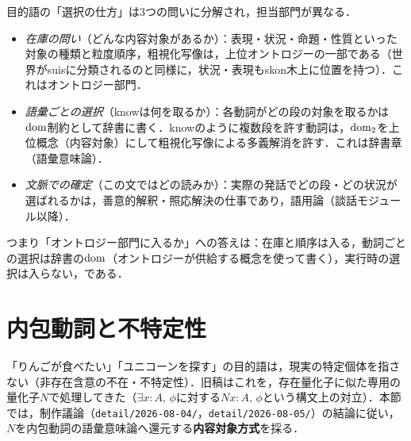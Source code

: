 \documentclass[../../main-detail.tex]{subfiles}
\begin{document}
\begin{remark}[部門の分担]
    目的語の「選択の仕方」は3つの問いに分解され，担当部門が異なる．
    \begin{itemize}
        \item \emph{在庫の問い}（どんな内容対象があるか）：表現・状況・命題・性質といった対象の種類と粒度順序，粗視化写像は，上位オントロジーの一部である（世界がsuisに分類されるのと同様に，状況・表現もskon木上に位置を持つ）．これはオントロジー部門．
        \item \emph{語彙ごとの選択}（knowは何を取るか）：各動詞がどの段の対象を取るかは$\mathop{\mathrm{dom}}\nolimits$制約として辞書に書く．knowのように複数段を許す動詞は，$\mathop{\mathrm{dom}}\nolimits_2$を上位概念（内容対象）にして粗視化写像による多義解消を許す．これは辞書章（語彙意味論）．
        \item \emph{文脈での確定}（この文ではどの読みか）：実際の発話でどの段・どの状況が選ばれるかは，善意的解釈・照応解決の仕事であり，語用論（談話モジュール以降）．
    \end{itemize}
    つまり「オントロジー部門に入るか」への答えは：在庫と順序は入る，動詞ごとの選択は辞書の$\mathop{\mathrm{dom}}\nolimits$（オントロジーが供給する概念を使って書く），実行時の選択は入らない，である．
\end{remark}

\section{内包動詞と不特定性}\label{sec:intensional-verbs}
「りんごが食べたい」「ユニコーンを探す」の目的語は，現実の特定個体を指さない（非存在含意の不在・不特定性）．旧稿はこれを，存在量化子に似た専用の量化子$N$で処理してきた（$\exists x{:}A,\,\phi$に対する$Nx{:}A,\,\phi$という構文上の対立）．本節では，制作議論（\texttt{detail/2026-08-04/}，\texttt{detail/2026-08-05/}）の結論に従い，$N$を内包動詞の語彙意味論へ還元する\textbf{内容対象方式}を採る．
\end{document}
